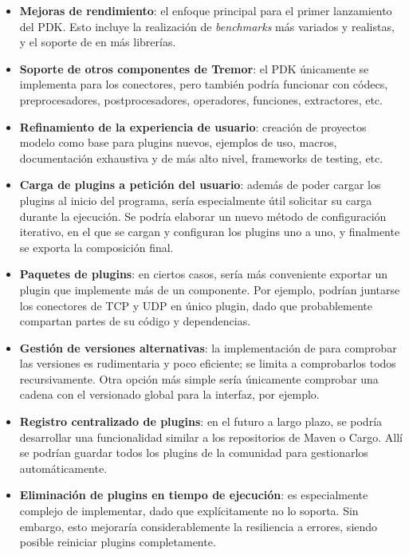 \begin{itemize}
    \item \textbf{Mejoras de rendimiento}: el enfoque principal para el primer
        lanzamiento del PDK. Esto incluye la realización de \emph{benchmarks}
        más variados y realistas, y el soporte de \abistable en más librerías.

    \item \textbf{Soporte de otros componentes de Tremor}: el PDK únicamente se
        implementa para los conectores, pero también podría funcionar con
        códecs, preprocesadores, postprocesadores, operadores, funciones,
        extractores, etc.

    \item \textbf{Refinamiento de la experiencia de usuario}: creación de
        proyectos modelo como base para plugins nuevos, ejemplos de uso, macros,
        documentación exhaustiva y de más alto nivel, frameworks de testing,
        etc.

    \item \textbf{Carga de plugins a petición del usuario}: además de poder
        cargar los plugins al inicio del programa, sería especialmente útil
        solicitar su carga durante la ejecución. Se podría elaborar un nuevo
        método de configuración iterativo, en el que se cargan y configuran los
        plugins uno a uno, y finalmente se exporta la composición final.

    \item \textbf{Paquetes de plugins}: en ciertos casos, sería más conveniente
        exportar un plugin que implemente más de un componente. Por ejemplo,
        podrían juntarse los conectores de TCP y UDP en único plugin, dado que
        probablemente compartan partes de su código y dependencias.

    \item \textbf{Gestión de versiones alternativas}: la implementación de
        \abistable para comprobar las versiones es rudimentaria y poco
        eficiente; se limita a comprobarlos todos recursivamente. Otra opción
        más simple sería únicamente comprobar una cadena con el versionado
        global para la interfaz, por ejemplo.

    \item \textbf{Registro centralizado de plugins}: en el futuro a largo plazo,
        se podría desarrollar una funcionalidad similar a los repositorios de
        Maven o Cargo. Allí se podrían guardar todos los plugins de la comunidad
        para gestionarlos automáticamente.

    \item \textbf{Eliminación de plugins en tiempo de ejecución}: es
        especialmente complejo de implementar, dado que \abistable
        explícitamente no lo soporta. Sin embargo, esto mejoraría
        considerablemente la resiliencia a errores, siendo posible reiniciar
        plugins completamente.

\end{itemize}

